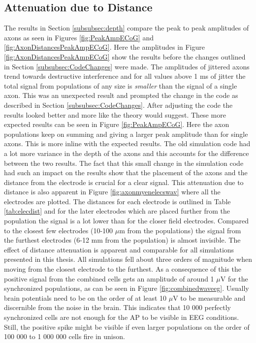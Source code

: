 \documentclass[final, a4paper,masters,en,listoffigures,listoftables,norwegiandates]{NMBU}
\begin{document}
\subsection{Attenuation due to Distance}
The results in Section \ref{subsubsec:depth} compare the peak to peak amplitudes of axons as seen in Figures \ref{fig:PeakAmpECoG} and \ref{fig:AxonDistancesPeakAmpECoG}. Here the amplitudes in Figure \ref{fig:AxonDistancesPeakAmpECoG} show the results before the changes outlined in Section \ref{subsubsec:CodeChanges} were made. The amplitudes of jittered axons trend towards destructive interference and for all values above 1 ms of jitter the total signal from populations of any size is \emph{smaller} than the signal of a single axon. This was an unexpected result and prompted the change in the code as described in Section \ref{subsubsec:CodeChanges}. After adjusting the code the results looked better and more like the theory would suggest. These more expected results can be seen in Figure \ref{fig:PeakAmpECoG}. Here the axon populations keep on summing and giving a larger peak amplitude than for single axons. This is more inline with the expected results. The old simulation code had a lot more variance in the depth of the axons and this accounts for the difference between the two results. The fact that this small change in the simulation code had such an impact on the results show that the placement of the axons and the distance from the electrode is crucial for a clear signal. 
\newline This attenuation due to distance is also apparent in Figure \ref{fig:axonmyenelecswav} where all the electrodes are plotted. The distances for each electrode is outlined in Table \ref{tab:elecdist} and for the later electrodes which are placed further from the population the signal is a lot lower than for the closer field electrodes. Compared to the closest few electrodes (10-100 $\mu$m from the populations) the signal from the furthest electrodes (6-12 mm from the population) is almost invisible. 
The effect of distance attenuation is apparent and comparable for all simulations presented in this thesis. All simulations fell about three orders of magnitude when moving from the closest electrode to the furthest. 
\newline As a consequence of this the positive signal from the combined cells gets an amplitude of around 1 $\mu$V for the synchronized populations, as can be seen in Figure \ref{fig:combinedwaveeg}. Usually brain potentials need to be on the order of at least 10 $\mu$V to be measurable and discernible from the noise in the brain. This indicates that 10 000 perfectly synchronized cells are not enough for the AP to be visible in EEG conditions. Still, the positive spike might be visible if even larger populations on the order of 100 000 to 1 000 000 cells fire in unison. 
\end{document}
